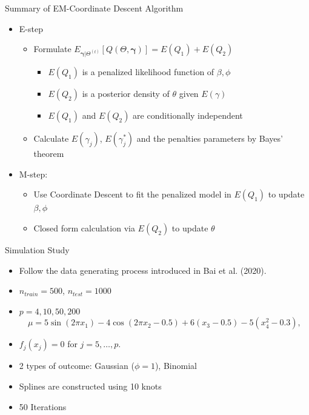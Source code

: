 \documentclass[
  ignorenonframetext,
  aspectratio=169]{beamer}
\providecommand{\tightlist}{%
  \setlength{\itemsep}{0pt}\setlength{\parskip}{0pt}}
\newcommand{\tp}{*}
\begin{document}
\begin{frame}{Summary of EM-Coordinate Descent Algorithm}
\protect\hypertarget{summary-of-em-coordinate-descent-algorithm-1}{}
\begin{itemize}
\tightlist
\item
  E-step

  \begin{itemize}
  \tightlist
  \item
    Formulate
    \(E_{\bm \gamma|\Theta^{(t)}}\left[Q(\Theta, \bm \gamma)\right] = E(Q_1) + E(Q_2)\)

    \begin{itemize}
    \tightlist
    \item
      \(E(Q_1)\) is a penalized likelihood function of \(\beta, \phi\)
    \item
      \(E(Q_2)\) is a posterior density of \(\theta\) given
      \(E(\gamma)\)
    \item
      \(E(Q_1)\) and \(E(Q_2)\) are conditionally independent
    \end{itemize}
  \item
    Calculate \(E(\gamma_{j})\), \(E(\gamma^\tp_{j})\) and the penalties
    parameters by Bayes' theorem
  \end{itemize}
\item
  M-step:

  \begin{itemize}
  \tightlist
  \item
    Use Coordinate Descent to fit the penalized model in \(E(Q_1)\) to
    update \(\beta, \phi\)
  \item
    Closed form calculation via \(E(Q_2)\) to update \(\theta\)
  \end{itemize}
\end{itemize}
\end{frame}

\begin{frame}{Simulation Study}
\protect\hypertarget{simulation-study-1}{}
\begin{itemize}
\item
  Follow the data generating process introduced in Bai et al. (2020).
\item
  \(n_{train} = 500\), \(n_{test}=1000\)
\item
  \(p=4, 10, 50, 200\) \[
  \mu = 5 \sin(2\pi x_1) - 4 \cos(2\pi x_2 -0.5) + 6(x_3-0.5) - 5(x_4^2 -0.3),
  \]
\item
  \(f_j(x_j) = 0\) for \(j = 5, \dots, p\).
\item
  2 types of outcome: Gaussian (\(\phi=1\)), Binomial
\item
  Splines are constructed using 10 knots
\item
  50 Iterations
\end{itemize}
\end{frame}
\end{document}
